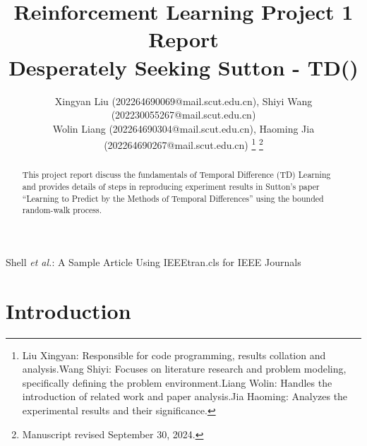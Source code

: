 \documentclass[lettersize,journal]{IEEEtran}
\begin{document}
\title{Reinforcement Learning Project 1 Report\\ Desperately Seeking Sutton - TD(\lambda)}

\author{Xingyan Liu (202264690069@mail.scut.edu.cn), Shiyi Wang (202230055267@mail.scut.edu.cn) \\Wolin Liang (202264690304@mail.scut.edu.cn), Haoming Jia (202264690267@mail.scut.edu.cn) 
\thanks{Liu Xingyan: Responsible for code programming, results collation and analysis.Wang Shiyi: Focuses on literature research and problem modeling, specifically defining the problem environment.Liang Wolin: Handles the introduction of related work and paper analysis.Jia Haoming: Analyzes the experimental results and their significance.}%
\thanks{Manuscript revised September 30, 2024.}}

%
{Shell \MakeLowercase{\textit{et al.}}: A Sample Article Using IEEEtran.cls for IEEE Journals}


\maketitle

\begin{abstract}
This project report discuss the fundamentals of Temporal Difference (TD) Learning and provides details of steps in reproducing experiment results in Sutton’s paper “Learning to Predict by the Methods of Temporal Differences”
 using the bounded random-walk process.
\end{abstract}

\section{Introduction}



\end{document}
